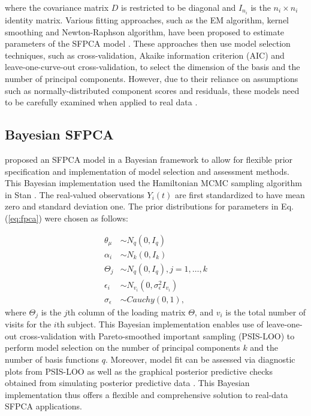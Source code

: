 \documentclass[aoas,preprint]{imsart}
\begin{document}
where the covariance matrix $D$ is restricted to be diagonal and $I_{n_i}$ is the $n_i \times n_i$ identity matrix. Various fitting approaches, such as the EM algorithm, kernel smoothing and Newton-Raphson algorithm, have been proposed to estimate parameters of the SFPCA model \citep{james2000principal, yao2005functional, peng2009geometric}. These approaches then use model selection techniques, such as cross-validation, Akaike information criterion (AIC) and leave-one-curve-out cross-validation, to select the dimension of the basis and the number of principal components. However, due to their reliance on assumptions such as normally-distributed component scores and residuals, these models need to be carefully examined when applied to real data \citep{kidzinski2018longitudinal}. 

\subsection{Bayesian SFPCA}
\citet{jiang2020bayestime} proposed an SFPCA model in a Bayesian framework to allow for flexible prior specification and implementation of model selection and assessment methods. This Bayesian implementation used the Hamiltonian MCMC sampling algorithm in \textsf{Stan} \citep{carpenter2017stan}. The real-valued observations $Y_i(t)$ are first standardized to have mean zero and standard deviation one. The prior distributions for parameters in Eq. (\ref{eq:fpca}) were chosen as follows:

\begin{align*}
    \theta_\mu  &\sim N_q (0,I_q ) \\
    \alpha_i &\sim N_k (0,I_k ) \\
    \Theta_j &\sim N_q (0,I_q ), j=1,\ldots,k \\
    \epsilon_i  &\sim N_{v_i} (0,\sigma_\epsilon^2 I_{v_i}) \\
    \sigma_\epsilon &\sim Cauchy(0,1),
\end{align*}
where $\Theta_j$ is the $j$th column of the loading matrix $\Theta$, and $v_i$ is the total number of visits for the $i$th subject. This Bayesian implementation enables use of 
leave-one-out cross-validation with Pareto-smoothed important sampling (PSIS-LOO) \citep{vehtari2017practical} to perform model selection on the number of principal components $k$ 
and the number of basis functions $q$.  Moreover, model fit can be assessed via diagnostic plots from PSIS-LOO as well as the graphical posterior predictive checks obtained from simulating posterior predictive data \citep{gelman1996posterior, gabry2019visualization}. This Bayesian implementation thus offers a flexible and comprehensive solution to real-data SFPCA applications.
\end{document}
